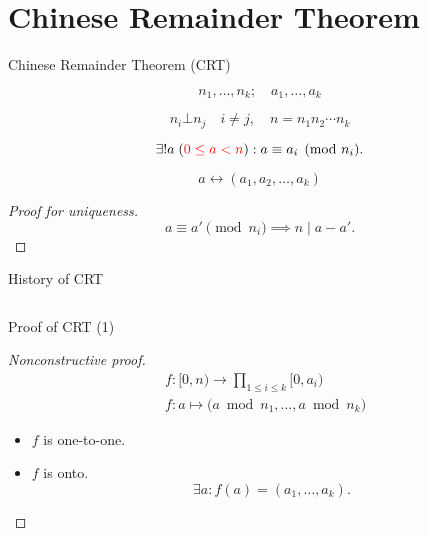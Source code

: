 \section{Chinese Remainder Theorem}

\begin{frame}{Chinese Remainder Theorem (CRT)}
  \begin{theorem}[CRT]
	\[
	  n_1, \ldots, n_k; \quad a_1, \ldots, a_k
	\]

	\[ 
	  n_i \bot n_j \quad i \neq j, \quad n = n_1n_2\cdots n_k 
	\]

    \[
	  \exists! a\; (\textcolor{red}{0 \le a < n}): a \equiv a_i \pmod{n_i}.
	\]
  \end{theorem}

  \pause
  \[
	a \leftrightarrow (a_1, a_2, \ldots, a_k)
  \]

  \pause
  \begin{proof}[Proof for uniqueness]
	\[
	  a \equiv a' \pmod{n_i} \implies n \mid a - a'.
	\]
  \end{proof}
\end{frame}
\begin{frame}{History of CRT}
  \begin{quote}
  \end{quote}

  \begin{columns}
	\pause
  \end{columns}
\end{frame}
\begin{frame}{Proof of CRT (1)}
  \begin{proof}[Nonconstructive proof]
	\begin{align*}
	  &f: [0,n) \to \prod_{1 \le i \le k} [0,a_i) \\
	  &f: a \mapsto \big( a \bmod n_1, \dots, a \bmod n_k \big)
	\end{align*}

	\pause

	\begin{itemize}[<+->]
	  \item $f$ is one-to-one.
	  \item $f$ is onto.
		\[
		  \exists a: f(a) = (a_1, \dots, a_k).
		\]
	\end{itemize}
  \end{proof}
\end{frame}
